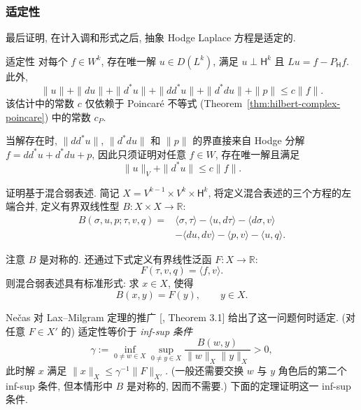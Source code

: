 \subsubsection{{适定性}}\label{subsec:hodge-well-posedness}

{最后证明, 在计入调和形式之后, 抽象 Hodge Laplace 方程是适定的.}

\begin{Theorem}{{适定性}}\label{thm:hodge-well-posedness}
{对每个 $f\in W^k$, 存在唯一解 $u\in D(L^k)$, 满足 $u\perp\mathsf H^k$ 且 $Lu=f-P_{\mathsf H}f$. 此外,}
\[
\|u\|+\|du\|+\|d^*u\|+\|dd^*u\|+\|d^*du\|+\|p\|\leq c\|f\|.
\]
{该估计中的常数 $c$ 仅依赖于 Poincaré 不等式 (Theorem~\ref{thm:hilbert-complex-poincare}) 中的常数 $c_P$.}
\end{Theorem}

\begin{Proof}
{当解存在时, $\|dd^*u\|$, $\|d^*du\|$ 和 $\|p\|$ 的界直接来自 Hodge 分解 $f=dd^*u+d^*du+p$, 因此只须证明对任意 $f\in W$, 存在唯一解且满足}
\[
\|u\|_V+\|d^*u\|\leq c\|f\|.
\]

{证明基于混合弱表述. 简记 $X=V^{k-1}\times V^k\times\mathsf H^k$, 将定义混合表述的三个方程的左端合并, 定义有界双线性型 $B:X\times X\to\mathbb R$:}
\begin{equation}\label{eq:hodge-mixed-bilinear-form}
\begin{aligned}
B(\sigma,u,p;\tau,v,q)={}&\langle\sigma,\tau\rangle-\langle u,d\tau\rangle-\langle d\sigma,v\rangle\\
&-\langle du,dv\rangle-\langle p,v\rangle-\langle u,q\rangle.
\end{aligned}
\end{equation}

{注意 $B$ 是对称的. 还通过下式定义有界线性泛函 $F:X\to\mathbb R$:}
\begin{equation}\label{eq:hodge-mixed-load-functional}
F(\tau,v,q)=\langle f,v\rangle.
\end{equation}
{则混合弱表述具有标准形式: 求 $x\in X$, 使得}
\begin{equation}\label{eq:hodge-mixed-abstract-problem}
B(x,y)=F(y),\qquad y\in X.
\end{equation}

{Nečas 对 Lax–Milgram 定理的推广 [, Theorem 3.1] 给出了这一问题何时适定. (对任意 $F\in X'$ 的) 适定性等价于 \emph{inf-sup 条件}}
\begin{equation}\label{eq:hodge-inf-sup-condition}
\gamma:=\inf_{0\ne w\in X}\sup_{0\ne y\in X}\frac{B(w,y)}{\|w\|_X\|y\|_X}>0,
\end{equation}
{此时解 $x$ 满足 $\|x\|_X\leq\gamma^{-1}\|F\|_{X'}$. (一般还需要交换 $w$ 与 $y$ 角色后的第二个 inf-sup 条件, 但本情形中 $B$ 是对称的, 因而不需要.) 下面的定理证明这一 inf-sup 条件.}
\end{Proof}

